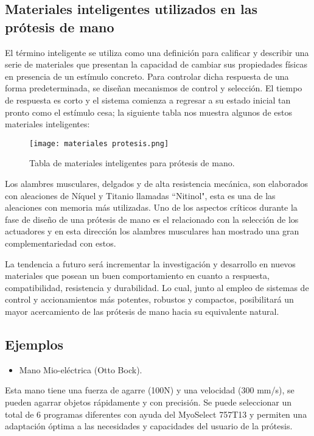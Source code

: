\documentclass[a4paper]{article}
\begin{document}
\subsection{Materiales inteligentes utilizados en las prótesis de mano}
El término inteligente se utiliza como una definición para calificar y describir una serie de materiales que presentan la capacidad de cambiar sus propiedades físicas en presencia de un estímulo concreto. Para controlar dicha respuesta de una forma predeterminada, se diseñan mecanismos de control y selección. El tiempo de respuesta es corto y el sistema comienza a regresar a su estado inicial tan pronto como el estímulo cesa; la siguiente tabla nos muestra algunos de estos materiales inteligentes: 
\begin{figure}[h]
\centering
\texttt{[image: materiales protesis.png]}
\caption{\label{fig:biomec1}Tabla de materiales inteligentes para prótesis de mano.}
\end{figure}

Los alambres musculares, delgados y de alta resistencia mecánica, son elaborados con aleaciones de Níquel y Titanio llamadas “Nitinol", esta es una de las aleaciones con memoria más utilizadas. Uno de los aspectos críticos durante la fase de diseño de una prótesis de mano es el relacionado con la selección de los actuadores y en esta dirección los alambres musculares han mostrado una gran complementariedad con estos. 

La tendencia a futuro será incrementar la investigación y desarrollo en nuevos materiales que posean un buen comportamiento en cuanto a respuesta, compatibilidad, resistencia y durabilidad. Lo cual, junto al empleo de sistemas de control y accionamientos más potentes, robustos y compactos, posibilitará un mayor acercamiento de las prótesis de mano hacia su equivalente natural\cite{ff4}. 


\subsection{Ejemplos}

\begin{itemize}
    \item Mano Mio-eléctrica (Otto Bock).
\end{itemize}
Esta mano tiene una fuerza de agarre (100N) y una velocidad (300 mm/s), se pueden agarrar objetos rápidamente y con precisión. Se puede seleccionar un total de 6 programas diferentes con ayuda del MyoSelect 757T13 y permiten una adaptación óptima a las necesidades y capacidades del usuario de la prótesis. 
\end{document}
